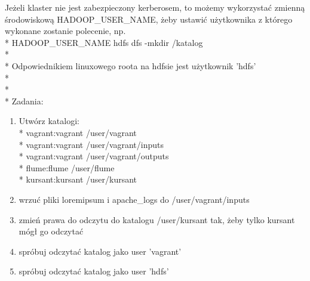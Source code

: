 \documentclass[11pt]{article}
\begin{document}
Jeżeli klaster nie jest zabezpieczony kerberosem, to możemy wykorzystać zmienną środowiskową HADOOP\_USER\_NAME, żeby ustawić użytkownika z którego wykonane zostanie polecenie, np.
\\*
HADOOP\_USER\_NAME hdfs dfs -mkdir /katalog
\\*
\\*
Odpowiednikiem linuxowego roota na hdfsie jest użytkownik 'hdfs'
\\*
\\*
\\*
Zadania:
\begin{enumerate}
\item Utwórz katalogi:\\*
vagrant:vagrant /user/vagrant
\\*
vagrant:vagrant /user/vagrant/inputs
\\*
vagrant:vagrant /user/vagrant/outputs
\\*
flume:flume /user/flume
\\*
kursant:kursant /user/kursant
\item wrzuć pliki loremipsum i apache\_logs do /user/vagrant/inputs
\item zmień prawa do odczytu do katalogu /user/kursant tak, żeby tylko kursant mógł go odczytać
\item spróbuj odczytać katalog jako user ’vagrant’
\item spróbuj odczytać katalog jako user ’hdfs’
\end{enumerate}
\end{document}

